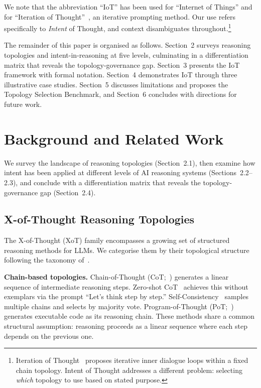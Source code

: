 \documentclass[11pt,a4paper]{article}
\begin{document}
We note that the abbreviation ``IoT'' has been used for ``Internet of Things'' and for ``Iteration of Thought''~\citep{radha2024iteration}, an iterative prompting method. Our use refers specifically to \emph{Intent} of Thought, and context disambiguates throughout.\footnote{Iteration of Thought~\citep{radha2024iteration} proposes iterative inner dialogue loops within a fixed chain topology. Intent of Thought addresses a different problem: selecting \emph{which} topology to use based on stated purpose.}

The remainder of this paper is organised as follows. Section~2 surveys reasoning topologies and intent-in-reasoning at five levels, culminating in a differentiation matrix that reveals the topology-governance gap. Section~3 presents the IoT framework with formal notation. Section~4 demonstrates IoT through three illustrative case studies. Section~5 discusses limitations and proposes the Topology Selection Benchmark, and Section~6 concludes with directions for future work.

\section{Background and Related Work}

We survey the landscape of reasoning topologies (Section~2.1), then examine how intent has been applied at different levels of AI reasoning systems (Sections~2.2--2.3), and conclude with a differentiation matrix that reveals the topology-governance gap (Section~2.4).

\subsection{X-of-Thought Reasoning Topologies}

The X-of-Thought (XoT) family encompasses a growing set of structured reasoning methods for LLMs. We categorise them by their topological structure following the taxonomy of~\citet{besta2025topologies}.

\textbf{Chain-based topologies.} Chain-of-Thought (CoT;~\citealt{wei2022chain}) generates a linear sequence of intermediate reasoning steps. Zero-shot CoT~\citep{kojima2022zero} achieves this without exemplars via the prompt ``Let's think step by step.'' Self-Consistency~\citep{wang2023self} samples multiple chains and selects by majority vote. Program-of-Thought (PoT;~\citealt{chen2023program}) generates executable code as its reasoning chain. These methods share a common structural assumption: reasoning proceeds as a linear sequence where each step depends on the previous one.
\end{document}
